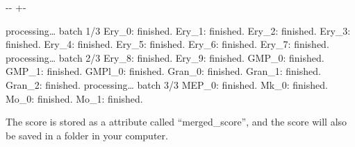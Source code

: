\documentclass[letterpaper,10pt,english]{sphinxmanual}
\newlength\nbsphinxcodecellspacing
\begin{document}
{

\kern-\sphinxverbatimsmallskipamount\kern-\baselineskip
\kern+\FrameHeightAdjust\kern-\fboxrule
\vspace{\nbsphinxcodecellspacing}

\begin{sphinxVerbatim}[commandchars=\\\{\}]
processing{\ldots} batch 1/3
Ery\_0: finished.
Ery\_1: finished.
Ery\_2: finished.
Ery\_3: finished.
Ery\_4: finished.
Ery\_5: finished.
Ery\_6: finished.
Ery\_7: finished.
processing{\ldots} batch 2/3
Ery\_8: finished.
Ery\_9: finished.
GMP\_0: finished.
GMP\_1: finished.
GMPl\_0: finished.
Gran\_0: finished.
Gran\_1: finished.
Gran\_2: finished.
processing{\ldots} batch 3/3
MEP\_0: finished.
Mk\_0: finished.
Mo\_0: finished.
Mo\_1: finished.
\end{sphinxVerbatim}
}

The score is stored as a attribute called “merged\_score”, and the score will also be saved in a folder in your computer.

{
\begin{sphinxVerbatim}[commandchars=\\\{\}]
\llap{\color{nbsphinxin}[33]:\,\hspace{\fboxrule}\hspace{\fboxsep}}
\end{sphinxVerbatim}
}
\end{document}

